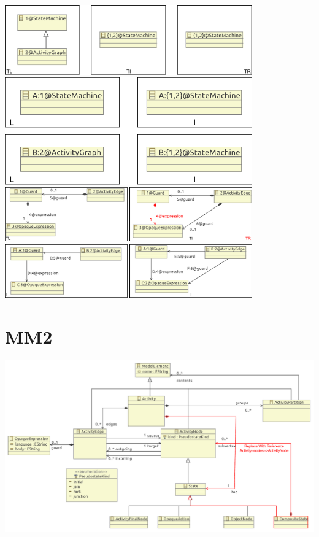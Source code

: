 \documentclass[a4paper,10pt]{article}
\begin{document}
\includegraphics[width=0.8\textwidth]{1/mm1_merge_to_superclass}\\
\includegraphics[width=0.8\textwidth]{1/mm1_merge_to_superclass_m}\\

\includegraphics[width=0.8\textwidth]{1/mm1_replace_reference}\\
\includegraphics[width=0.8\textwidth]{1/mm1_replace_reference_m}


\section{MM2}

\includegraphics[width=\textwidth]{2/original_minimal_metamodel_2}\\
\end{document}
